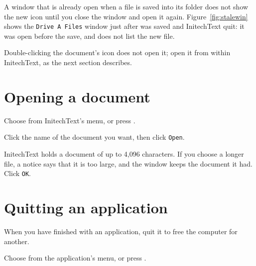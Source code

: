 
A window that is already open when a file is saved into its folder does
not show the new icon until you close the window and open it again.
Figure~\ref{fig:stalewin} shows the \texttt{Drive A Files} window just
after  was saved and InitechText quit: it was open before the
save, and does not list the new file.

Double-clicking the document's icon does not open it; open it from within
InitechText, as the next section describes.

\section{Opening a document}
\begin{TaskSteps}
\Step Choose  from InitechText's  menu,
or press .
\end{TaskSteps}


\begin{TaskSteps}[resume]
\Step Click the name of the document you want, then click \texttt{Open}.
\end{TaskSteps}

InitechText holds a document of up to 4,096 characters.  If you choose a
longer file, a notice says that it is too large, and the window keeps the
document it had.  Click \texttt{OK}.


\section{Quitting an application}
When you have finished with an application, quit it to free the computer
for another.
\begin{TaskSteps}
\Step Choose  from the application's  menu,
or press .
\end{TaskSteps}

